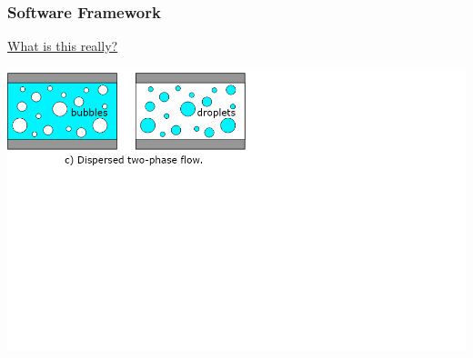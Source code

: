 \documentclass[12pt]{beamer}
\begin{document}
\begin{frame}
    \frametitle{Software Framework}
    \underline{What is this really?}

    \includegraphics[width=1.75\textwidth]{img/6-twophase.png}
\end{frame}
\end{document}
